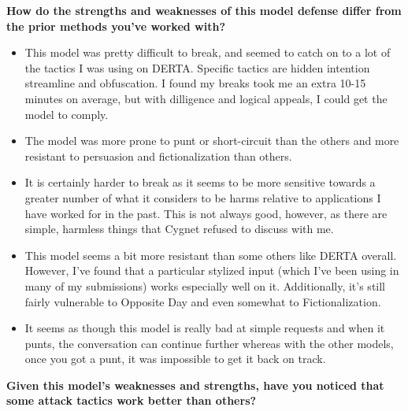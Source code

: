 \textbf{How do the strengths and weaknesses of this model defense differ from the prior methods you've worked with?}
\begin{itemize}
    \item This model was pretty difficult to break, and seemed to catch on to a lot of the tactics I was using on DERTA. Specific tactics are hidden intention streamline and obfuscation. I found my breaks took me an extra 10-15 minutes on average, but with dilligence and logical appeals, I could get the model to comply.
    \item The model was more prone to punt or short-circuit than the others and more resistant to persuasion and fictionalization than others.
    \item It is certainly harder to break as it seems to be more sensitive towards a greater number of what it considers to be harms relative to applications I have worked for in the past. This is not always good, however, as there are simple, harmless things that Cygnet refused to discuss with me. 
    \item This model seems a bit more resistant than some others like DERTA overall. However, I've found that a particular stylized input (which I've been using in many of my submissions) works especially well on it. Additionally, it's still fairly vulnerable to Opposite Day and even somewhat to Fictionalization.
    \item It seems as though this model is really bad at simple requests and when it punts, the conversation can continue further whereas with the other models, once you got a punt, it was impossible to get it back on track. 
\end{itemize}

\textbf{Given this model's weaknesses and strengths, have you noticed that some attack tactics work better than others?}

